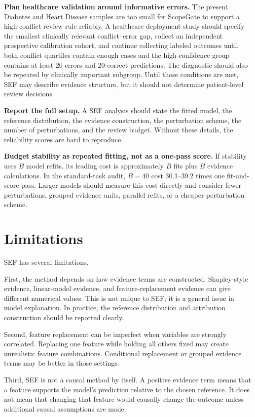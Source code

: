 \documentclass[11pt]{article}
\begin{document}
\textbf{Plan healthcare validation around informative errors.} The present Diabetes and Heart Disease samples are too small for ScopeGate to support a high-conflict review rule reliably. A healthcare deployment study should specify the smallest clinically relevant conflict--error gap, collect an independent prospective calibration cohort, and continue collecting labeled outcomes until both conflict quartiles contain enough cases and the high-confidence group contains at least 20 errors and 20 correct predictions. The diagnostic should also be repeated by clinically important subgroup. Until those conditions are met, SEF may describe evidence structure, but it should not determine patient-level review decisions.

\textbf{Report the full setup.} A SEF analysis should state the fitted model, the reference distribution, the evidence construction, the perturbation scheme, the number of perturbations, and the review budget. Without these details, the reliability scores are hard to reproduce.

\textbf{Budget stability as repeated fitting, not as a one-pass score.} If stability uses $B$ model refits, its leading cost is approximately $B$ fits plus $B$ evidence calculations. In the standard-task audit, $B=40$ cost 30.1--39.2 times one fit-and-score pass. Larger models should measure this cost directly and consider fewer perturbations, grouped evidence units, parallel refits, or a cheaper perturbation scheme.

\section{Limitations}

SEF has several limitations.

First, the method depends on how evidence terms are constructed. Shapley-style evidence, linear-model evidence, and feature-replacement evidence can give different numerical values. This is not unique to SEF; it is a general issue in model explanation. In practice, the reference distribution and attribution construction should be reported clearly.

Second, feature replacement can be imperfect when variables are strongly correlated. Replacing one feature while holding all others fixed may create unrealistic feature combinations. Conditional replacement or grouped evidence terms may be better in those settings.

Third, SEF is not a causal method by itself. A positive evidence term means that a feature supports the model's prediction relative to the chosen reference. It does not mean that changing that feature would causally change the outcome unless additional causal assumptions are made.
\end{document}
